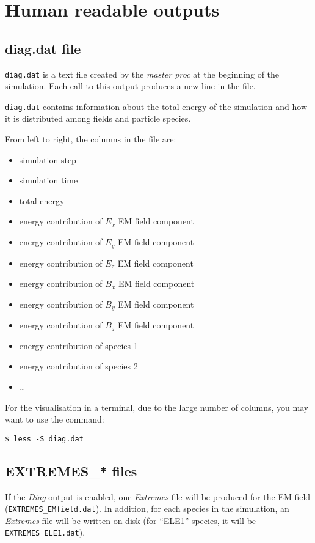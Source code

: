 \documentclass[11pt,a4paper]{report}
\begin{document}
\section{Human readable outputs}
\subsection{diag.dat file}
\verb+diag.dat+ is a text file created by the \emph{master proc} at the beginning of the simulation. Each call to this output produces a new line in the file.

\verb+diag.dat+ contains information about the total energy of the simulation and how it is distributed among fields and particle species.

From left to right, the columns in the file are:
\begin{itemize}
\item simulation step
\item simulation time
\item total energy
\item energy contribution of $E_x$ EM field component
\item energy contribution of $E_y$ EM field component
\item energy contribution of $E_z$ EM field component
\item energy contribution of $B_x$ EM field component
\item energy contribution of $B_y$ EM field component
\item energy contribution of $B_z$ EM field component
\item energy contribution of species 1
\item energy contribution of species 2
\item \ldots
\end{itemize}
For the visualisation in a terminal, due to the large number of columns, you may want to use the command:
\begin{verbatim}
$ less -S diag.dat
\end{verbatim}

\subsection{EXTREMES\_* files}
If the \emph{Diag} output is enabled, one \emph{Extremes} file will be produced for the EM field (\verb+EXTREMES_EMfield.dat+). In addition, for each species in the simulation, an \emph{Extremes} file will be written on disk (for ``ELE1'' species, it will be \verb+EXTREMES_ELE1.dat+).
\end{document}
